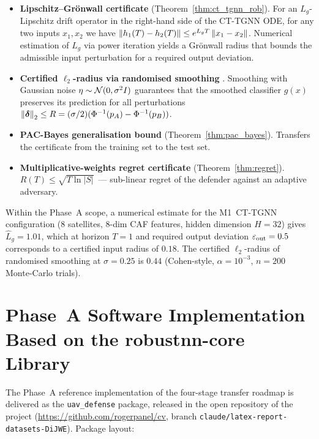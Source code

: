\begin{itemize}\setlength\itemsep{0.15em}
\item \textbf{Lipschitz--Grönwall certificate}
(Theorem~\ref{thm:ct_tgnn_rob}). For an $L_g$-Lipschitz drift
operator in the right-hand side of the CT-TGNN ODE, for any two
inputs $x_1,x_2$ we have
$\left\lVert h_1(T)-h_2(T)\right\rVert \le e^{L_g T}\left\lVert x_1-x_2\right\rVert$. Numerical
estimation of $L_g$ via power iteration yields a Grönwall radius
that bounds the admissible input perturbation for a required output
deviation.

\item \textbf{Certified $\ell_2$-radius via randomised smoothing}
\cite{Cohen2019}. Smoothing with Gaussian noise
$\eta\sim\mathcal{N}(0,\sigma^2 I)$ guarantees that the smoothed classifier
$g(x)$ preserves its prediction for all perturbations
$\left\lVert\boldsymbol{\delta}\right\rVert_2 \le R = (\sigma/2)(\Phi^{-1}(p_A) - \Phi^{-1}(p_B))$.

\item \textbf{PAC-Bayes generalisation bound}
(Theorem~\ref{thm:pac_bayes}). Transfers the certificate from the
training set to the test set.

\item \textbf{Multiplicative-weights regret certificate}
(Theorem~\ref{thm:regret}). $R(T)\le\sqrt{T\ln|S|}$~--- sub-linear
regret of the defender against an adaptive adversary.
\end{itemize}

Within the Phase~A scope, a numerical estimate for the
\textsf{M1~CT-TGNN} configuration (8 satellites, 8-dim CAF features,
hidden dimension $H=32$) gives $\hat L_g = 1.01$, which at horizon
$T=1$ and required output deviation $\varepsilon_{\text{out}}=0.5$ corresponds
to a certified input radius of $0.18$. The certified $\ell_2$-radius
of randomised smoothing at $\sigma=0.25$ is $0.44$ (Cohen-style,
$\alpha=10^{-3}$, $n=200$ Monte-Carlo trials).


\section{Phase~A Software Implementation Based on the
\textsf{robustnn-core} Library}
\label{sec:uav_phase_a}

The Phase~A reference implementation of the four-stage transfer
roadmap is delivered as the \texttt{uav\_defense} package, released
in the open repository of the project
(\url{https://github.com/rogerpanel/cv},
branch \texttt{claude/latex-report-datasets-DiJWE}). Package layout:

